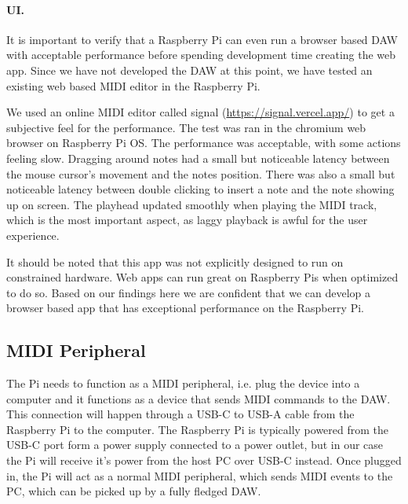 \paragraph{UI.} It is important to verify that a Raspberry Pi can even run a browser based
DAW with acceptable performance before spending development time creating the web app.
Since we have not developed the DAW at this point, we have tested an existing web based
MIDI editor in the Raspberry Pi.

We used an online MIDI editor called signal (\url{https://signal.vercel.app/}) to get a
subjective feel for the performance. The test was ran in the chromium web browser on
Raspberry Pi OS. The performance was acceptable, with some actions feeling slow.
Dragging around notes had a small but noticeable latency between the mouse cursor's
movement and the notes position. There was also a small but noticeable latency between
double clicking to insert a note and the note showing up on screen. The playhead updated
smoothly when playing the MIDI track, which is the most important aspect, as laggy
playback is awful for the user experience.

It should be noted that this app was not explicitly designed to run on constrained
hardware. Web apps can run great on Raspberry Pis when optimized to do so. Based on our
findings here we are confident that we can develop a browser based app that has
exceptional performance on the Raspberry Pi.

\subsection{MIDI Peripheral}
\label{sec:midi_peripheral}

The Pi needs to function as a MIDI peripheral, i.e. plug the device into a computer and it
functions as a device that sends MIDI commands to the DAW. This connection will happen
through a USB-C to USB-A cable from the Raspberry Pi to the computer. The Raspberry Pi is
typically powered from the USB-C port form a power supply connected to a power outlet, but
in our case the Pi will receive it's power from the host PC over USB-C instead. Once
plugged in, the Pi will act as a normal MIDI peripheral, which sends MIDI events to the
PC, which can be picked up by a fully fledged DAW.

